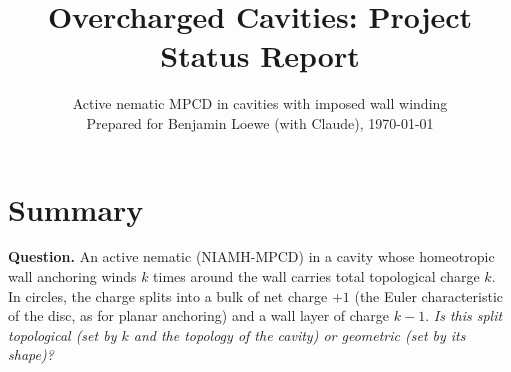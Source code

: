 \documentclass[11pt,a4paper]{article}
\title{Overcharged Cavities: Project Status Report}
\author{Active nematic MPCD in cavities with imposed wall winding\\[2pt]
\small Prepared for Benjamin Loewe (with Claude), \today}
\date{}
\begin{document}
\maketitle
\tableofcontents
\bigskip

\section{Summary}
\textbf{Question.} An active nematic (NIAMH-MPCD) in a cavity whose homeotropic wall anchoring winds $k$ times
around the wall carries total topological charge $k$. In circles, the charge splits into a bulk of net
charge $+1$ (the Euler characteristic of the disc, as for planar anchoring) and a wall layer of charge $k-1$.
\emph{Is this split topological (set by $k$ and the topology of the cavity) or geometric (set by its shape)?}
\end{document}
